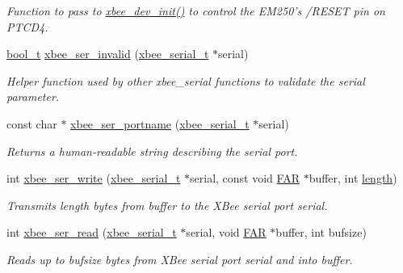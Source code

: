 \begin{DoxyCompactItemize}
\begin{DoxyCompactList}\small\item\em Function to pass to \hyperlink{group__xbee__device_ga550d7c865e75d3fc1df0e64cb880cf3d}{xbee\-\_\-dev\-\_\-init()} to control the E\-M250's /\-R\-E\-S\-E\-T pin on P\-T\-C\-D4. \end{DoxyCompactList}\item 
\hyperlink{group__hal_ga04dd5074964518403bf944f2b240a5f8}{bool\-\_\-t} \hyperlink{group__hal__hcs08_ga9bf21a5b024e4919bbe8b605c8f45351}{xbee\-\_\-ser\-\_\-invalid} (\hyperlink{structxbee__serial__t}{xbee\-\_\-serial\-\_\-t} $\ast$serial)
\begin{DoxyCompactList}\small\item\em Helper function used by other xbee\-\_\-serial functions to validate the {\itshape serial} parameter. \end{DoxyCompactList}\item 
const char $\ast$ \hyperlink{group__hal__hcs08_ga898057d1b7645785e7f3d6256828d039}{xbee\-\_\-ser\-\_\-portname} (\hyperlink{structxbee__serial__t}{xbee\-\_\-serial\-\_\-t} $\ast$serial)
\begin{DoxyCompactList}\small\item\em Returns a human-\/readable string describing the serial port. \end{DoxyCompactList}\item 
int \hyperlink{group__hal__hcs08_ga2ca4e60c9d642084afa52dff9e1f6be4}{xbee\-\_\-ser\-\_\-write} (\hyperlink{structxbee__serial__t}{xbee\-\_\-serial\-\_\-t} $\ast$serial, const void \hyperlink{group__hal_gaef060b3456fdcc093a7210a762d5f2ed}{F\-A\-R} $\ast$buffer, int \hyperlink{group__zdo_gab2b3adeb2a67e656ff030b56727fd0ac}{length})
\begin{DoxyCompactList}\small\item\em Transmits {\itshape length} bytes from {\itshape buffer} to the X\-Bee serial port {\itshape serial}. \end{DoxyCompactList}\item 
int \hyperlink{group__hal__hcs08_ga8263312373c03a79a718142e051b3342}{xbee\-\_\-ser\-\_\-read} (\hyperlink{structxbee__serial__t}{xbee\-\_\-serial\-\_\-t} $\ast$serial, void \hyperlink{group__hal_gaef060b3456fdcc093a7210a762d5f2ed}{F\-A\-R} $\ast$buffer, int bufsize)
\begin{DoxyCompactList}\small\item\em Reads up to {\itshape bufsize} bytes from X\-Bee serial port {\itshape serial} and into {\itshape buffer}. \end{DoxyCompactList}\item 

\end{DoxyCompactItemize}
